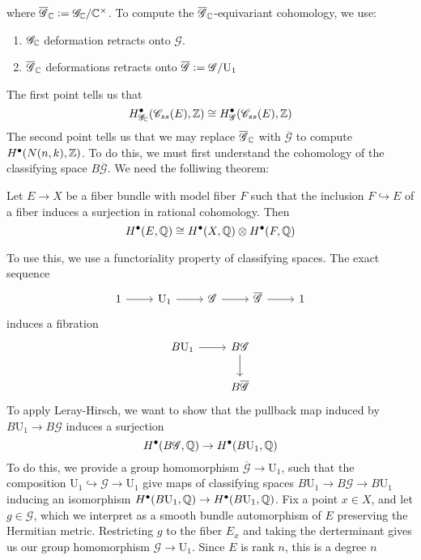where $\overline{\mathscr{G}}_{\mathbb{C}} \vcentcolon= \mathscr{G}_{\mathbb{C}}/\mathbb{C}^\times$. To
compute the $\overline{\mathscr{G}}_{\mathbb{C}}$-equivariant cohomology, we use:
\begin{enumerate}
  \item $\mathscr{G}_{\mathbb{C}}$ deformation retracts onto $\mathscr{G}$.
  \item $\overline{\mathscr{G}}_{\mathbb{C}}$ deformations retracts onto
  $\overline{\mathscr{G}} \vcentcolon= \mathscr{G}/\mathrm{U}_1$
\end{enumerate}
The first point tells us that
\[
H^\bullet_{\mathscr{G}_{\mathbb{C}}}(\mathscr{C}_{ss}(E),\mathbb{Z})
\cong H^\bullet_\mathscr{G}(\mathscr{C}_{ss}(E),\mathbb{Z})
\]
The second point tells us that we may replace $\overline{\mathscr{G}}_{\mathbb{C}}$ with
$\overline{\mathscr{G}}$ to compute $H^\bullet(N(n,k),\mathbb{Z})$. To do this, we
must first understand the cohomology of the classifying space
$B\overline{\mathscr{G}}$. We need the folliwing theorem:
%
\begin{thm}
Let $E \to X$ be a fiber bundle with model fiber $F$ such that
the inclusion $F \hookrightarrow E$ of a fiber induces a surjection
in rational cohomology. Then
\[
H^\bullet(E,\mathbb{Q}) \cong H^\bullet(X,\mathbb{Q}) \otimes H^\bullet(F,\mathbb{Q})
\]
\end{thm}
%
To use this, we use a functoriality property of classifying spaces.
The exact sequence
\[\begin{tikzcd}
1 \ar[r] & \mathrm{U}_1 \ar[r] & \mathscr{G} \ar[r] & \overline{\mathscr{G}} \ar[r] & 1
\end{tikzcd}\]
induces a fibration
\[\begin{tikzcd}
B \mathrm{U}_1 \ar[r] & B\mathscr{G} \ar[d] \\
& B\overline{\mathscr{G}}
\end{tikzcd}\]
To apply Leray-Hirsch, we want to show that the pullback map induced
by $B \mathrm{U}_1 \to B\mathscr{G}$ induces a surjection
\[
H^\bullet(B\mathscr{G},\mathbb{Q}) \to H^\bullet(B \mathrm{U}_1, \mathbb{Q})
\]
To do this, we provide a group homomorphism $\overline{\mathscr{G}} \to \mathrm{U}_1$,
such that the composition $\mathrm{U}_1 \hookrightarrow \mathscr{G} \to \mathrm{U}_1$
give maps of classifying spaces $B\mathrm{U}_1 \to B\mathscr{G} \to B\mathrm{U}_1$
inducing an isomorphism $H^\bullet(B \mathrm{U}_1,\mathbb{Q}) \to H^\bullet(B \mathrm{U}_1,\mathbb{Q})$.
Fix a point $x \in X$, and let $g \in \mathscr{G}$, which we interpret as a
smooth bundle automorphism of $E$ preserving the Hermitian metric. Restricting $g$
to the fiber $E_x$ and taking the derterminant gives us our group homomorphism
$\mathscr{G} \to \mathrm{U}_1$. Since $E$ is rank $n$, this is a degree $n$
